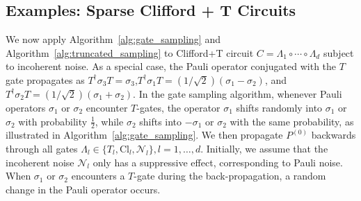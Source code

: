 \documentclass[aps,%
twocolumn,%
floatfix,%
pra,%
amsfonts,%
longbibliography,%
groupedaddress,%
superscriptaddress]{revtex4-2}%
\newcommand{\1}{\mathbbm{1}}
\begin{document}
\subsection{Examples: Sparse Clifford + T Circuits}
We now apply Algorithm~\ref{alg:gate_sampling} and Algorithm~\ref{alg:truncated_sampling} to Clifford+T circuit $C = \Lambda_1 \circ \cdots \circ \Lambda_d$ subject to incoherent noise. As a special case, the Pauli operator conjugated with the $T$ gate propagates as $T^\dagger \sigma_3 T = \sigma_3$,$T^\dagger \sigma_1 T = ({1}/{\sqrt{2}}) (\sigma_1-\sigma_2 )$, and $T^\dagger \sigma_2 T =  ({1}/{\sqrt{2}}) (\sigma_1 + \sigma_2)$.
In the gate sampling algorithm, whenever Pauli operators \( \sigma_1 \) or \( \sigma_2 \) encounter \( T \)-gates, the operator \( \sigma_1 \) shifts randomly into \( \sigma_1 \) or \( \sigma_2 \) with probability \( \frac{1}{2} \), while \( \sigma_2 \) shifts into \( -\sigma_1 \) or \( \sigma_2 \) with the same probability, as illustrated in Algorithm~\ref{alg:gate_sampling}.
We then propagate \( P^{(0)} \) backwards through all gates \( \Lambda_l \in \{ T_l, \text{Cl}_l, \mathcal{N}_l \}, l = 1, \dots, d \). 
Initially, we assume that the incoherent noise \( \mathcal{N}_l \) only has a suppressive effect, corresponding to Pauli noise. 
When \( \sigma_1 \) or \( \sigma_2 \) encounters a \( T \)-gate during the back-propagation, a random change in the Pauli operator occurs.
\end{document}
